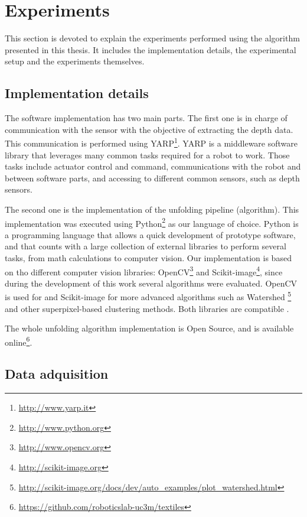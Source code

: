 \section{Experiments}
\label{experiments}

This section is devoted to explain the experiments performed using the algorithm presented in this thesis. It includes the implementation details, the experimental setup and the experiments themselves.

\subsection{Implementation details}
The software implementation has two main parts. The first one is in charge of communication with the sensor with the objective of extracting the depth data. This communication is performed using YARP\footnote{\url{http://www.yarp.it}}. YARP is a middleware software library  that leverages many common tasks required for a robot to work. Those tasks include actuator control and command, communications with the robot and between software parts, and accessing to different common sensors, such as depth sensors.

The second one is the implementation of the unfolding pipeline (algorithm). This implementation was executed using Python\footnote{\url{http://www.python.org}} as our language of choice. Python is a programming language that allows a quick development of prototype software, and that counts with a large collection of external libraries  to perform several tasks, from math calculations to computer vision. Our implementation is based on tho different computer vision libraries: OpenCV\footnote{\url{http://www.opencv.org}} and Scikit-image\footnote{\url{http://scikit-image.org}}, since during the development of this work several algorithms were evaluated. OpenCV is used for  and Scikit-image for more advanced algorithms such as Watershed \footnote{\url{http://scikit-image.org/docs/dev/auto_examples/plot_watershed.html}} and other superpixel-based clustering methods. Both libraries are compatible .

The whole unfolding algorithm implementation is Open Source, and is available online\footnote{\url{https://github.com/roboticslab-uc3m/textiles}}.

\subsection{Data adquisition}
\label{data_adquisition}

